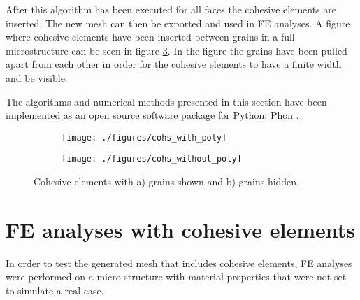 \documentclass[grain_boundary_law.tex]{subfiles}
\begin{document}
After this algorithm has been executed for all faces the cohesive elements are inserted. The new mesh can then be exported and used in FE analyses. A figure where cohesive elements have been inserted between grains in a full microstructure can be seen in figure \ref{fig:cohs_large}. In the figure the grains have been pulled apart from each other in order for the cohesive elements to have a finite width and be visible.

The algorithms and numerical methods presented in this section have been implemented as an open source software package for Python: Phon \cite{Phon}.



\begin{figure}[htpb!]
\centering
\begin{subfigure}[b]{.5\textwidth}
  \centering
  \texttt{[image: ./figures/cohs\_with\_poly]}
  \caption{}
  \label{fig:cohs_large_a}
\end{subfigure}%
\begin{subfigure}[b]{.5\textwidth}
  \centering
  \texttt{[image: ./figures/cohs\_without\_poly]}
  \caption{}
  \label{fig:cohs_large_b}
\end{subfigure}
\caption{Cohesive elements with a) grains shown and b) grains hidden.}
\label{fig:cohs_large}
\end{figure}


\section{FE analyses with cohesive elements}

In order to test the generated mesh that includes cohesive elements, FE analyses were performed on a micro structure with material properties that were not set to simulate a real case.
\end{document}
